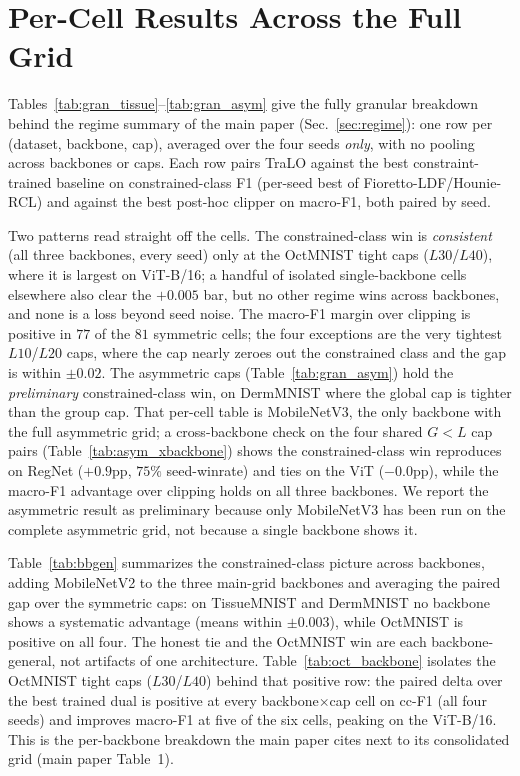 \documentclass[letterpaper]{article}
\begin{document}
\section{Per-Cell Results Across the Full Grid}
\label{app:regime}

Tables~\ref{tab:gran_tissue}--\ref{tab:gran_asym} give the fully granular breakdown
behind the regime summary of the main paper (Sec.~\ref{sec:regime}): one row per
(dataset, backbone, cap), averaged over the four seeds \emph{only}, with no pooling across
backbones or caps. Each row pairs TraLO against the best constraint-trained baseline on
constrained-class F1 (per-seed best of Fioretto-LDF/Hounie-RCL) and against the best
post-hoc clipper on macro-F1, both paired by seed.

Two patterns read straight off the cells. The constrained-class win is
\emph{consistent} (all three backbones, every seed) only at the OctMNIST tight caps
($L30$/$L40$), where it is largest on ViT-B/16; a handful of isolated single-backbone
cells elsewhere also clear the $+0.005$ bar, but no other regime wins across backbones,
and none is a loss beyond seed noise. The macro-F1 margin over clipping is positive in
$77$ of the $81$ symmetric cells; the four exceptions are the very tightest $L10$/$L20$
caps, where the cap nearly zeroes out the constrained class and the gap is within
$\pm0.02$. The asymmetric caps (Table~\ref{tab:gran_asym}) hold the
\emph{preliminary} constrained-class win, on DermMNIST where the global cap is tighter
than the group cap. That per-cell table is MobileNetV3, the only backbone with the full
asymmetric grid; a cross-backbone check on the four shared $G{<}L$ cap pairs
(Table~\ref{tab:asym_xbackbone}) shows the constrained-class win reproduces on RegNet
($+0.9$pp, $75\%$ seed-winrate) and ties on the ViT ($-0.0$pp), while the macro-F1
advantage over clipping holds on all three backbones. We report the asymmetric result as
preliminary because only MobileNetV3 has been run on the complete asymmetric grid, not
because a single backbone shows it.

Table~\ref{tab:bbgen} summarizes the constrained-class picture across backbones, adding
MobileNetV2 to the three main-grid backbones and averaging the paired gap over the symmetric
caps: on TissueMNIST and DermMNIST no backbone shows a systematic advantage (means within
$\pm0.003$), while OctMNIST is positive on all four. The honest tie and the OctMNIST win are
each backbone-general, not artifacts of one architecture.
Table~\ref{tab:oct_backbone} isolates the OctMNIST tight caps ($L30$/$L40$) behind that
positive row: the paired delta over the best trained dual is positive at every
backbone$\times$cap cell on cc-F1 (all four seeds) and improves macro-F1 at five of the
six cells, peaking on the ViT-B/16. This is the per-backbone breakdown the main paper
cites next to its consolidated grid (main paper Table~1).
\end{document}
